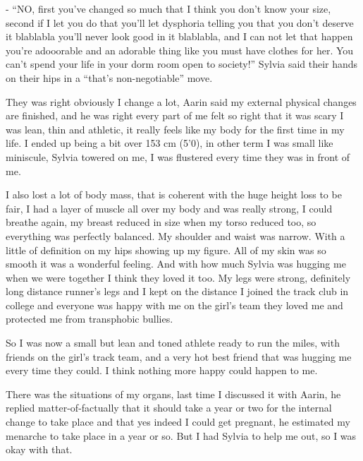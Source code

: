 \documentclass[colorlinks,12pt,a4paper]{book}
\begin{document}
 - “NO, first you've changed so much that I think you don't know your size, second if I let you do that you'll let dysphoria 
 telling you that you don't deserve it blablabla you'll never look good in it blablabla, and I can not let that happen 
 you're adooorable and an adorable thing like you must have clothes for her. You can't spend your life in your dorm room 
 open to society!” Sylvia said their hands on their hips in a “that's non-negotiable” move.\par
 \bigskip
 
 They was right obviously I change a lot, Aarin said my external physical changes are finished, and he was right every 
 part of me felt so right that it was scary I was lean, thin and athletic, it really feels like my body for the first 
 time in my life. I ended up being a bit over 153 cm (5'0), in other term I was small like miniscule, Sylvia towered 
 on me, I was flustered every time they was in front of me.\par
 \bigskip
 
 I also lost a lot of body mass, that is coherent with the huge height loss to be fair, I had a layer of muscle all 
 over my body and was really strong, I could breathe again, my breast reduced in size when my torso reduced too, so 
 everything was perfectly balanced. My shoulder and waist was narrow. With a little of definition on my hips showing up 
 my figure. All of my skin was so smooth it was a wonderful feeling. And with how much Sylvia was hugging me when we were 
 together I think they loved it too. My legs were strong, definitely long distance runner's legs and I kept on the distance 
 I joined the track club in college and everyone was happy with me on the girl's team they loved me and protected me 
 from transphobic bullies.\par
 \bigskip
 
 So I was now a small but lean and toned athlete ready to run the miles, with friends on the girl's track team, and a 
 very hot best friend that was hugging me every time they could. I think nothing more happy could happen to me.\par
 \bigskip
 
 There was the situations of my organs, last time I discussed it with Aarin, he replied matter-of-factually that 
 it should take a year or two for the internal change to take place and that yes indeed I could get pregnant, he estimated
  my menarche to take place in a year or so. But I had Sylvia to help me out, so I was okay with that.\par
  \bigskip
 
\end{document}
